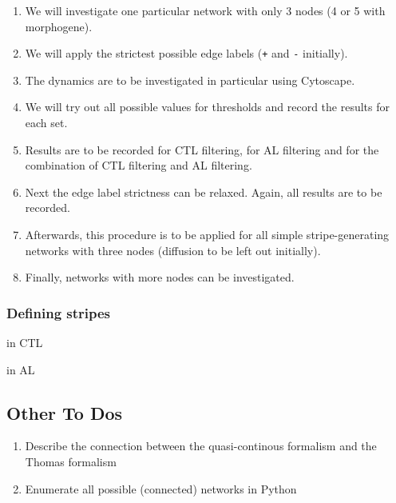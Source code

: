 \documentclass{article}
\begin{document}
\begin{enumerate}
  \item We will investigate one particular network with only 3 nodes (4 or 5
  with morphogene).
  \item We will apply the strictest possible edge labels ({\tt +} and {\tt -}
  initially).
  \item The dynamics are to be investigated in particular using Cytoscape.
  \item We will try out all possible values for thresholds and record the
  results for each set.
  \item Results are to be recorded for CTL filtering, for AL filtering and for
  the combination of CTL filtering and AL filtering.
  \item Next the edge label strictness can be relaxed. Again, all results are to
  be recorded.
  \item Afterwards, this procedure is to be applied for all simple
  stripe-generating networks with three nodes (diffusion to be left out initially).
  \item Finally, networks with more nodes can be investigated.
\end{enumerate}

\subsubsection{Defining stripes}

in CTL

in AL

\subsection{Other To Dos}

\begin{enumerate}
  \item Describe the connection between the quasi-continous formalism and the
  Thomas formalism
  \item Enumerate all possible (connected) networks in Python
\end{enumerate}

\end{document}
